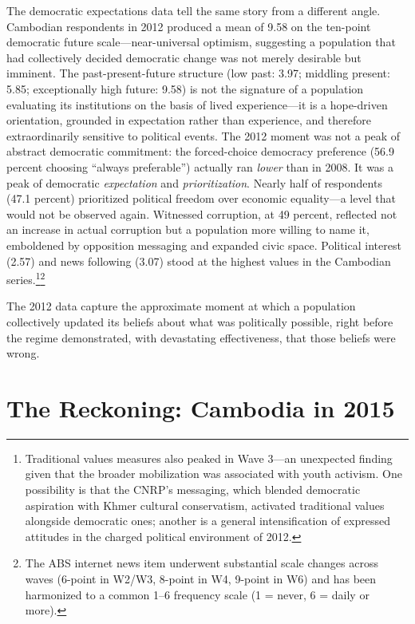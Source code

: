 \documentclass[Review,times,sageh,doublespace]{sagej}
\begin{document}
The democratic expectations data tell the same story from a different
angle. Cambodian respondents in 2012 produced a mean of 9.58 on the
ten-point democratic future scale---near-universal optimism, suggesting
a population that had collectively decided democratic change was not
merely desirable but imminent. The past-present-future structure (low
past: 3.97; middling present: 5.85; exceptionally high future: 9.58) is
not the signature of a population evaluating its institutions on the
basis of lived experience---it is a hope-driven orientation, grounded in
expectation rather than experience, and therefore extraordinarily
sensitive to political events. The 2012 moment was not a peak of
abstract democratic commitment: the forced-choice democracy preference
(56.9 percent choosing ``always preferable'') actually ran \emph{lower}
than in 2008. It was a peak of democratic \emph{expectation} and
\emph{prioritization}. Nearly half of respondents (47.1 percent)
prioritized political freedom over economic equality---a level that
would not be observed again. Witnessed corruption, at 49 percent,
reflected not an increase in actual corruption but a population more
willing to name it, emboldened by opposition messaging and expanded
civic space. Political interest (2.57) and news following (3.07) stood
at the highest values in the Cambodian series.\footnote{Traditional
  values measures also peaked in Wave 3---an unexpected finding given
  that the broader mobilization was associated with youth activism. One
  possibility is that the CNRP's messaging, which blended democratic
  aspiration with Khmer cultural conservatism, activated traditional
  values alongside democratic ones; another is a general intensification
  of expressed attitudes in the charged political environment of 2012.}\footnote{The
  ABS internet news item underwent substantial scale changes across
  waves (6-point in W2/W3, 8-point in W4, 9-point in W6) and has been
  harmonized to a common 1--6 frequency scale (1 = never, 6 = daily or
  more).}

The 2012 data capture the approximate moment at which a population
collectively updated its beliefs about what was politically possible,
right before the regime demonstrated, with devastating effectiveness,
that those beliefs were wrong.

\section{The Reckoning: Cambodia in
2015}\label{the-reckoning-cambodia-in-2015}
\end{document}
